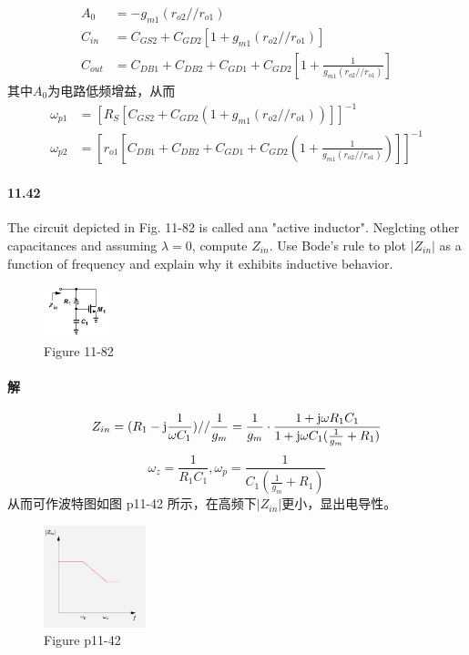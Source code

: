 \documentclass[hyperref, UTF8]{ctexart}
\newcommand{\under}[1]{\frac{1}{#1}}
\newcommand{\J}{{\rm j}}
\begin{document}
    \begin{align*}
        A_0 & = - g_{m1}\left(r_{o2} // r_{o1} \right) \\
        C_{in} & = C_{GS2}+C_{GD2}\left[1 + g_{m1}\left(r_{o2} // r_{o1} \right)\right] \\
        C_{out} & = C_{DB1} + C_{DB2} + C_{GD1} + C_{GD2}\left[1 + \under{g_{m1}\left(r_{o2} // r_{o1} \right)}\right]
    \end{align*}
    其中$A_0$为电路低频增益，从而
    \begin{align*}
        \omega_{p1} & = \left[ R_S
        \left[ C_{GS2}+C_{GD2}\left(1 + g_{m1}\left(r_{o2} // r_{o1} \right)\right) \right] 
        \right] ^ {-1} \\
        \omega_{p2} & = \left[ 
            r_{o1}
            \left[ C_{DB1} + C_{DB2} + C_{GD1} + C_{GD2}\left(1 + \under{g_{m1}\left(r_{o2} // r_{o1} \right)}\right) \right] 
            \right] ^ {-1}
    \end{align*}

\paragraph{11.42} \label{11.42}
    The circuit depicted in Fig. 11-82 is called ana "active inductor". Neglcting other capacitances and assuming $\lambda = 0$, compute $Z_{in}$. Use Bode's rule to plot $|Z_{in}|$ as a function of frequency and explain why it exhibits inductive behavior.

    \begin{figure}[!htb]
        \centering
        \includegraphics[width=0.170\textwidth]{p11-82.png}
        \caption*{Figure 11-82}
    \end{figure}

\paragraph{解}
    $$Z_{in} = (R_1 - \J \under{\omega C_1}) // \under{g_{m}} = \under{g_{m}} \cdot \frac{1+\J \omega R_1 C_1}{1 + \J \omega C_1(\under{g_m}+R_1)}$$
    $$\omega_z = \under{R_1C_1}, \omega_p = \under{C_1(\under{g_m}+R_1)}$$
    从而可作波特图如图 p11-42 所示，在高频下$|Z_{in}|$更小，显出电导性。

    \begin{figure}[!htb]
        \centering
        \includegraphics[width=0.263\textwidth]{p11-42-sol.png}
        \caption*{Figure p11-42}
    \end{figure}
    
\end{document}
